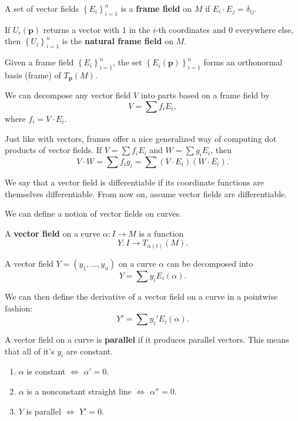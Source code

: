 \documentclass[10pt]{report}
\begin{document}
\begin{defn}[]
	A set of vector fields $\left\{ E_i \right\}_{i=1}^n$ is a \textbf{frame field} on $M$ if $E_i \cdot E_j = \delta_{ij}$.
\end{defn}

\begin{ex}[]
	If $U_i(\mathbf{p})$ returns a vector with 1 in the $i$-th coordinates and 0 everywhere else, then $\left\{ U_i \right\}_{i=1}^n$ is the \textbf{natural frame field} on $M$.
\end{ex}

Given a frame field $\left\{ E_i \right\}_{i=1}^n$, the set $\left\{ E_i(\mathbf{p}) \right\}_{i=1}^n$ forms an orthonormal basis (frame) of $T_{\mathbf{p}}(M)$.

\begin{prop}
We can decompose any vector field $V$ into parts based on a frame field by
\[V = \sum f_i E_i,\]
where $f_i = V \cdot E_i$.
\end{prop}

Just like with vectors, frames offer a nice generalized way of computing dot products of vector fields. If $V = \sum f_i E_i$ and $W = \sum g_i E_i$, then
\[
	V \cdot W = \sum f_i g_i = \sum (V \cdot E_i) (W \cdot E_i).
\] 

\begin{note}
	We say that a vector field is differentiable if its coordinate functions are themselves differentiable. From now on, assume vector fields are differentiable.
\end{note}

We can define a notion of vector fields on curves.

\begin{defn}[]
	A \textbf{vector field} on a curve $\alpha:I\to M$ is a function
	\[
		Y: I \to T_{\alpha(t)}(M).
	\]
\end{defn}

A vector field $Y=(y_1, \dots, y_n)$ on a curve $\alpha$ can be decomposed into
\[
	Y = \sum y_i E_i(\alpha).
\] 

We can then define the derivative of a vector field on a curve in a pointwise fashion:
\[
	Y' = \sum y_i' E_i(\alpha).
\] 

A vector field on a curve is \textbf{parallel} if it produces parallel vectors. This means that all of it's $y_i$ are constant.

\begin{prop}
	\begin{enumerate}
		\item $\alpha$ is constant $\iff$ $\alpha'=0$.
		\item $\alpha$ is a nonconstant straight line $\iff$ $\alpha''=0$.
		\item $Y$ is parallel $\iff$ $Y'=0$.
	\end{enumerate}
\end{prop}
\end{document}
